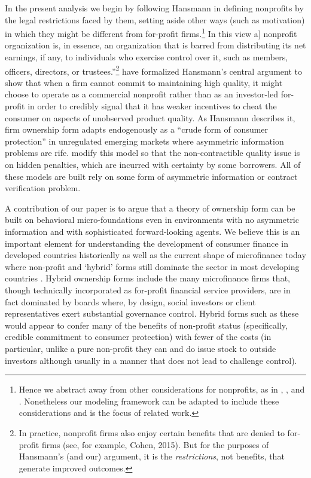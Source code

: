 \documentclass[11pt,english]{article}
\theoremstyle{plain}
\theoremstyle{definition}
\begin{document}
In the present analysis we begin by following Hansmann in defining
nonprofits by the legal restrictions faced by them, setting aside
other ways (such as motivation) in which they might be different from
for-profit firms.\footnote{Hence we abstract away from other considerations for nonprofits, as
in \citet{besley2005}, \citet{mcintosh2005},
and \citet{guha2013}. Nonetheless our modeling framework
can be adapted to include these considerations and is the focus of
related work.} In this view \textquotedbl{}{[}a{]} nonprofit organization is, in
essence, an organization that is barred from distributing its net
earnings, if any, to individuals who exercise control over it, such
as members, officers, directors, or trustees.\textquotedblright \footnote{In practice, nonprofit firms also enjoy certain benefits that are
denied to for-profit firms (see, for example, Cohen, 2015). But for
the purposes of Hansmann's (and our) argument, it is the \textit{restrictions},
not benefits, that generate improved outcomes.} \citet{glaeser2001} have formalized Hansmann's central
argument to show that when a firm cannot commit to maintaining high
quality, it might choose to operate as a commercial nonprofit rather
than as an investor-led for-profit in order to credibly signal that
it has weaker incentives to cheat the consumer on aspects of unobserved
product quality. As Hansmann describes it, firm ownership form adapts
endogenously as a ``crude form of consumer protection'' in unregulated
emerging markets where asymmetric information problems are rife. \citet{bubb_consumer_2013}
modify this model so that the non-contractible quality issue is on
hidden penalties, which are incurred with certainty by some borrowers.
All of these models are built rely on some form of asymmetric information
or contract verification problem.

A contribution of our paper is to argue that a theory of ownership
form can be built on behavioral micro-foundations even in environments
with no asymmetric information and with sophisticated forward-looking
agents. We believe this is an important element for understanding
the development of consumer finance in developed countries historically
as well as the current shape of microfinance today where non-profit
and `hybrid' forms still dominate the sector in most developing countries
\citep{cull2009,conning2011}. Hybrid
ownership forms include the many microfinance firms that, though technically
incorporated as for-profit financial service providers, are in fact
dominated by boards where, by design, social investors or client representatives
exert substantial governance control. Hybrid forms such as these would
appear to confer many of the benefits of non-profit status (specifically,
credible commitment to consumer protection) with fewer of the costs
(in particular, unlike a pure non-profit they can and do issue stock
to outside investors although usually in a manner that does not lead
to challenge control).
\end{document}
